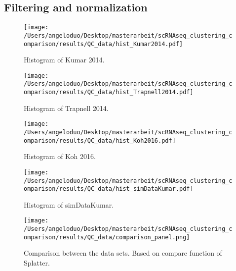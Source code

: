 \documentclass[11pt, a4paper]{article}\usepackage[]{graphicx}\usepackage[]{color}
\begin{document}
\subsection{Filtering and normalization}

\begin{figure}[!h]
\texttt{[image: /Users/angeloduo/Desktop/masterarbeit/scRNAseq\_clustering\_comparison/results/QC\_data/hist\_Kumar2014.pdf]}
\caption{Histogram of Kumar 2014.}
\label{fig:histkumar}
\end{figure}

\begin{figure}[!h]
\texttt{[image: /Users/angeloduo/Desktop/masterarbeit/scRNAseq\_clustering\_comparison/results/QC\_data/hist\_Trapnell2014.pdf]}
\caption{Histogram of Trapnell 2014. }
\label{fig:histtrap}
\end{figure}

\begin{figure}[!h]
\texttt{[image: /Users/angeloduo/Desktop/masterarbeit/scRNAseq\_clustering\_comparison/results/QC\_data/hist\_Koh2016.pdf]}
\caption{Histogram of Koh 2016. }
\label{fig:histkoh}
\end{figure}


\begin{figure}[!h]
\texttt{[image: /Users/angeloduo/Desktop/masterarbeit/scRNAseq\_clustering\_comparison/results/QC\_data/hist\_simDataKumar.pdf]}
\caption{Histogram of simDataKumar. }
\label{fig:histsim}
\end{figure}



\begin{figure}[!h]
\texttt{[image: /Users/angeloduo/Desktop/masterarbeit/scRNAseq\_clustering\_comparison/results/QC\_data/comparison\_panel.png]}
\caption{Comparison between the data sets. Based on compare function of Splatter.}
\label{fig:compare}
\end{figure}
\end{document}
